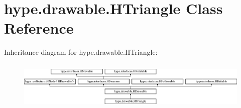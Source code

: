 \hypertarget{classhype_1_1drawable_1_1_h_triangle}{\section{hype.\-drawable.\-H\-Triangle Class Reference}
\label{classhype_1_1drawable_1_1_h_triangle}
}
Inheritance diagram for hype.\-drawable.\-H\-Triangle\-:\begin{figure}[H]
\begin{center}
\leavevmode
\includegraphics[height=2.333333cm]{classhype_1_1drawable_1_1_h_triangle}
\end{center}
\end{figure}
